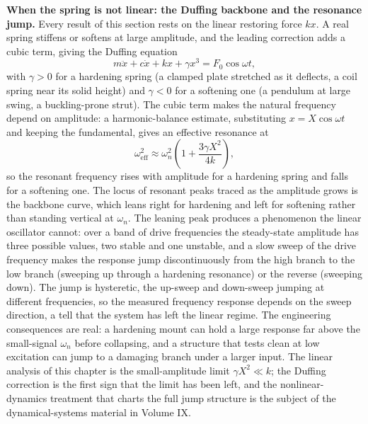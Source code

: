 \begin{mastery}
\textbf{When the spring is not linear: the Duffing backbone and the
resonance jump.} Every result of this section rests on the linear
restoring force $kx$. A real spring stiffens or softens at large
amplitude, and the leading correction adds a cubic term, giving the
Duffing equation
\[
m\ddot{x} + c\dot{x} + kx + \gamma x^3 = F_0\cos\omega t,
\]
with $\gamma > 0$ for a hardening spring (a clamped plate stretched as
it deflects, a coil spring near its solid height) and $\gamma < 0$ for a
softening one (a pendulum at large swing, a buckling-prone strut). The
cubic term makes the natural frequency depend on amplitude: a
harmonic-balance estimate, substituting $x = X\cos\omega t$ and keeping
the fundamental, gives an effective resonance at
\[
\omega_{\text{eff}}^2 \approx \omega_n^2\left(1 + \frac{3\gamma X^2}{4k}
\right),
\]
so the resonant frequency rises with amplitude for a hardening spring
and falls for a softening one. The locus of resonant peaks traced as the
amplitude grows is the backbone curve, which leans right for hardening
and left for softening rather than standing vertical at $\omega_n$. The
leaning peak produces a phenomenon the linear oscillator cannot: over a
band of drive frequencies the steady-state amplitude has three possible
values, two stable and one unstable, and a slow sweep of the drive
frequency makes the response jump discontinuously from the high branch
to the low branch (sweeping up through a hardening resonance) or the
reverse (sweeping down). The jump is hysteretic, the up-sweep and
down-sweep jumping at different frequencies, so the measured frequency
response depends on the sweep direction, a tell that the system has left
the linear regime. The engineering consequences are real: a hardening
mount can hold a large response far above the small-signal $\omega_n$
before collapsing, and a structure that tests clean at low excitation can
jump to a damaging branch under a larger input. The linear analysis of
this chapter is the small-amplitude limit $\gamma X^2 \ll k$; the
Duffing correction is the first sign that the limit has been left, and
the nonlinear-dynamics treatment that charts the full jump structure is
the subject of the dynamical-systems material in Volume IX.
\end{mastery}

